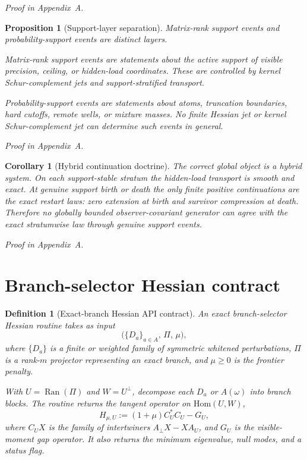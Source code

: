 \documentclass[11pt,a4paper]{article}
\numberwithin{equation}{section}
\DeclareMathOperator{\Ran}{Ran}
\theoremstyle{thmcompact}
\newtheorem{proposition}[theorem]{Proposition}
\newtheorem{corollary}[theorem]{Corollary}
\newtheorem{definition}[theorem]{Definition}
\theoremstyle{remark}
\newcommand{\proofappendix}{\par{\hfill\scriptsize\emph{Proof in Appendix~A.}}\par}
\begin{document}
\proofappendix

\begin{proposition}[Support-layer separation]
\label{prop:support-layer-separation}
Matrix-rank support events and probability-support events are distinct layers.

Matrix-rank support events are statements about the active support of visible precision, ceiling, or hidden-load coordinates. These are controlled by kernel Schur-complement jets and support-stratified transport.

Probability-support events are statements about atoms, truncation boundaries, hard cutoffs, remote wells, or mixture masses. No finite Hessian jet or kernel Schur-complement jet can determine such events in general.
\end{proposition}

\proofappendix

\begin{corollary}[Hybrid continuation doctrine]
\label{cor:hybrid-continuation}
The correct global object is a hybrid system. On each support-stable stratum the hidden-load transport is smooth and exact. At genuine support birth or death the only finite positive continuations are the exact restart laws: zero extension at birth and survivor compression at death. Therefore no globally bounded observer-covariant generator can agree with the exact stratumwise law through genuine support events.
\end{corollary}

\proofappendix

\section{Branch-selector Hessian contract}

\begin{definition}[Exact-branch Hessian API contract]
\label{def:branch-hessian-contract}
An exact branch-selector Hessian routine takes as input
\begin{equation}
\bigl(\{D_a\}_{a\in A},\,\Pi,\,\mu\bigr),
\end{equation}
where $\{D_a\}$ is a finite or weighted family of symmetric whitened perturbations, $\Pi$ is a rank-$m$ projector representing an exact branch, and $\mu\ge 0$ is the frontier penalty.

With $U=\Ran(\Pi)$ and $W=U^\perp$, decompose each $D_a$ or $A(\omega)$ into branch blocks. The routine returns the tangent operator on $\mathrm{Hom}(U,W)$,
\begin{equation}
H_{\mu,U}:=(1+\mu)C_U^*C_U-G_U,
\end{equation}
where $C_UX$ is the family of intertwiners $A_\perp X-XA_U$, and $G_U$ is the visible-moment gap operator. It also returns the minimum eigenvalue, null modes, and a status flag.
\end{definition}
\end{document}
